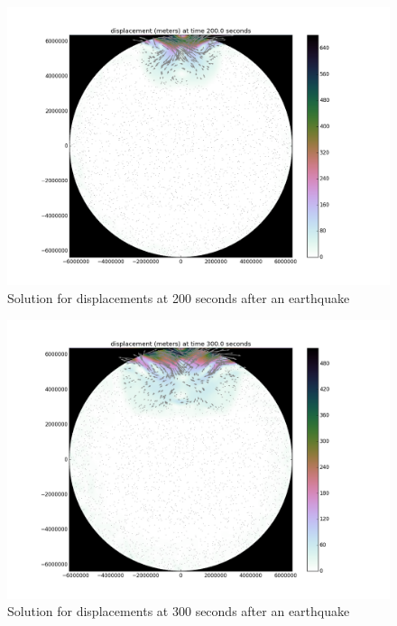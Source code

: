 \documentclass[12pt]{article}
\begin{document}
\begin{figure}
\includegraphics[scale=0.4]{figures/200s}
\centering
\caption{Solution for displacements at 200 seconds after an earthquake}
\end{figure}

\begin{figure}
\includegraphics[scale=0.4]{figures/300s}
\centering
\caption{Solution for displacements at 300 seconds after an earthquake}
\end{figure}
\end{document}
